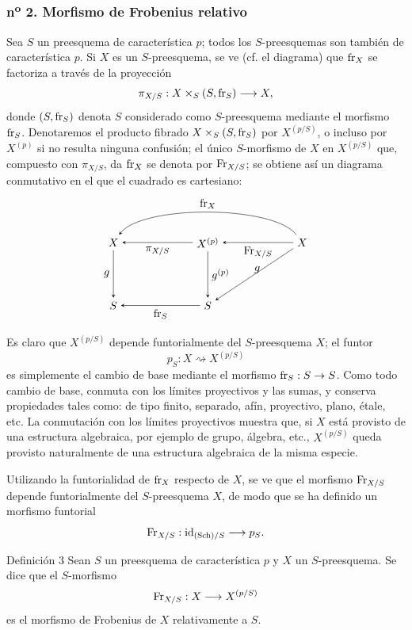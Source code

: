 \subsubsection*{n\textsuperscript{o} 2. Morfismo de Frobenius relativo}

Sea $S$ un preesquema de característica $p$; todos los $S$-preesquemas son también de característica $p$. Si $X$ es un $S$-preesquema, se ve (cf. el diagrama) que $\operatorname{fr}_X$ se factoriza a través de la proyección
\[
\pi_{X/S}:X\times_S(S,\operatorname{fr}_S)\longrightarrow X,
\]
donde $(S,\operatorname{fr}_S)$ denota $S$ considerado como $S$-preesquema mediante el morfismo $\operatorname{fr}_S$. Denotaremos el producto fibrado $X\times_S(S,\operatorname{fr}_S)$ por $X^{(p/S)}$, o incluso por $X^{(p)}$ si no resulta ninguna confusión; el único $S$-morfismo de $X$ en $X^{(p/S)}$ que, compuesto con $\pi_{X/S}$, da $\operatorname{fr}_X$ se denota por $\operatorname{Fr}_{X/S}$; se obtiene así un diagrama conmutativo en el que el cuadrado es cartesiano:
\[
\begin{tikzpicture}[baseline=(current bounding box.center),>=stealth]
\node (XL) at (0,2.0) {$X$};
\node (XM) at (3.0,2.0) {$X^{(p)}$};
\node (XR) at (6.0,2.0) {$X$};
\node (SL) at (0,0) {$S$};
\node (SM) at (3.0,0) {$S$};
\draw[->] (XM) -- node[below] {$\pi_{X/S}$} (XL);
\draw[->] (XR) -- node[below] {$\Fr_{X/S}$} (XM);
\draw[->] (XR) .. controls (5.1,3.2) and (0.9,3.2) .. node[above] {$\fr_X$} (XL);
\draw[->] (XL) -- node[left] {$g$} (SL);
\draw[->] (XM) -- node[right] {$g^{(p)}$} (SM);
\draw[->] (XR) -- node[pos=.55,above right] {$g$} (SM);
\draw[->] (SM) -- node[below] {$\fr_S$} (SL);
\end{tikzpicture}
\]

Es claro que $X^{(p/S)}$ depende funtorialmente del $S$-preesquema $X$; el funtor
\[
p_S:X\rightsquigarrow X^{(p/S)}
\]
es simplemente el cambio de base mediante el morfismo $\operatorname{fr}_S:S\to S$. Como todo cambio de base, conmuta con los límites proyectivos y las sumas, y conserva propiedades tales como: de tipo finito, separado, afín, proyectivo, plano, étale, etc. La conmutación con los límites proyectivos muestra que, si $X$ está provisto de una estructura algebraica, por ejemplo de grupo, álgebra, etc., $X^{(p/S)}$ queda provisto naturalmente de una estructura algebraica de la misma especie.

Utilizando la funtorialidad de $\operatorname{fr}_X$ respecto de $X$, se ve que el morfismo $\operatorname{Fr}_{X/S}$ depende funtorialmente del $S$-preesquema $X$, de modo que se ha definido un morfismo funtorial
\[
\operatorname{Fr}_{X/S}:\operatorname{id}_{(\operatorname{Sch})/S}\longrightarrow p_S.
\]

\begin{statement}{Definición 3}
Sean $S$ un preesquema de característica $p$ y $X$ un $S$-preesquema. Se dice que el $S$-morfismo
\[
\operatorname{Fr}_{X/S}:X\longrightarrow X^{(p/S)}
\]
es el morfismo de Frobenius de $X$ relativamente a $S$.
\end{statement}
